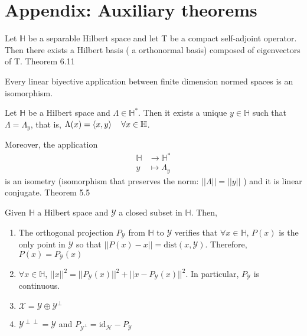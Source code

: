 
\chapter{Appendix: Auxiliary theorems}\label{ap:appendix}

\begin{teorema} \label{th:spectral theorem}
    Let $\mathbb{H}$ be a separable Hilbert space and let T be a compact self-adjoint operator. Then there exists a Hilbert basis ( a orthonormal basis) composed of eigenvectors of T. \cite{brezis2011functional} Theorem 6.11
\end{teorema}

\begin{teorema} \label{th:Hausdorff theorem}
    Every linear biyective application between finite dimension normed spaces is an isomorphism. \cite{paya-apuntes}
\end{teorema}

\begin{teorema} \label{th:Riesz theorem}
    Let $\mathbb{H}$ be a Hilbert space and $\Lambda \in \mathbb{H}^{*}$. Then it exists a unique $y \in \mathbb{H}$ such that $\Lambda = \Lambda_y$, that is, $\Lambda(x) = \braket{x,y}\quad \forall x \in \mathbb{H}$.

    Moreover, the application 
    \begin{align}
        \mathbb{H} &\longrightarrow \mathbb{H}^{*}\\
        y &\longmapsto \Lambda_y
    \end{align}
    is an isometry (isomorphism that preserves the norm: $||\Lambda|| = ||y||$ ) and it is linear conjugate. \cite{brezis2011functional} Theorem 5.5
\end{teorema} 

\begin{teorema} \label{th:orthogonal projection theorem}
    Given $\mathbb{H}$ a Hilbert space and $\mathcal{Y}$ a closed subset in $\mathbb{H}$. Then,
    \begin{enumerate}
        \item The orthogonal projection $P_{\mathcal{Y}}$ from $\mathbb{H}$ to $\mathcal{Y}$ verifies that $\forall x \in \mathbb{H}$, $P(x)$ is the only point in $\mathcal{Y}$ so that $|| P(x) - x|| = \mathrm{dist}(x,\mathcal{Y})$. Therefore, $P(x) = P_{\mathcal{Y}}(x)$ 
        \item $\forall x \in \mathbb{H}$, $||x||^2 = ||P_{\mathcal{Y}}(x)||^2 + ||x - P_{\mathcal{Y}}(x)||^2$. In particular, $P_{\mathcal{Y}}$ is continuous.
        \item $\mathcal{X} = \mathcal{Y} \oplus \mathcal{Y}^{\perp}$
        \item $\mathcal{Y}^{\perp \perp} = \mathcal{Y}$ and $P_{\mathcal{Y}^{\perp}} = \mathrm{id}_{\mathcal{H}} - P_{\mathcal{Y}}$
    \end{enumerate}
    \cite{mariamedina-apuntes}
\end{teorema}

